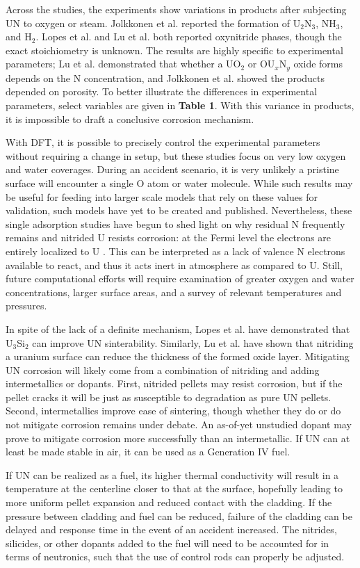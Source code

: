 \documentclass[11pt]{article}
\begin{document}
Across the studies, the experiments show variations in products after subjecting UN to oxygen or steam. Jolkkonen et al. reported the formation of U$_{2}$N$_{3}$, NH$_{3}$, and H$_{2}$. Lopes et al. and Lu et al. both reported oxynitride phases, though the exact stoichiometry is unknown. The results are highly specific to experimental parameters; Lu et al. demonstrated that whether a UO$_{2}$ or  OU$_{x}$N$_{y}$ oxide forms depends on the N concentration, and Jolkkonen et al. showed the products depended on porosity. To better illustrate the differences in experimental parameters, select variables are given in \textbf{Table 1}. With this variance in products, it is impossible to draft a conclusive corrosion mechanism.
\par With DFT, it is possible to precisely control the experimental parameters without requiring a change in setup, but these studies focus on very low oxygen and water coverages. During an accident scenario, it is very unlikely a pristine surface will encounter a single O atom or water molecule. While such results may be useful for feeding into larger scale models that rely on these values for validation,  such models have yet to be created and published. Nevertheless, these single adsorption studies have begun to shed light on why residual N frequently remains and nitrided U resists corrosion: at the Fermi level the electrons are entirely localized to U \cite{Bo2016}. This can be interpreted as a lack of valence N electrons available to react, and thus it acts inert in atmosphere as compared to U. Still, future computational efforts will require examination of greater oxygen and water concentrations, larger surface areas, and a survey of relevant temperatures and pressures. 
\par 
In spite of the lack of a definite mechanism, Lopes et al. \cite{Lopes2017} have demonstrated that U$_{3}$Si$_{2}$ can improve UN sinterability. Similarly, Lu et al. \cite{Lu2016} have shown that nitriding a uranium surface can reduce the thickness of the formed oxide layer.
Mitigating UN corrosion will likely come from a combination of nitriding and adding intermetallics or dopants. First, nitrided pellets may resist corrosion, but if the pellet cracks it will be just as susceptible to degradation as pure UN pellets. Second, intermetallics improve ease of sintering, though whether they do or do not mitigate corrosion remains under debate. An as-of-yet unstudied dopant may prove to mitigate corrosion more successfully than an intermetallic. If UN can at least be made stable in air, it can be used as a Generation IV fuel.
\par 
If UN can be realized as a fuel, its higher thermal conductivity will result in a temperature at the centerline closer to that at the surface, hopefully leading to more uniform pellet expansion and reduced contact with the cladding. If the pressure between cladding and fuel can be reduced, failure of the cladding can be delayed and response time in the event of an accident increased. The nitrides, silicides, or other dopants added to the fuel will need to be accounted for in terms of neutronics, such that the use of control rods can properly be adjusted.
\end{document}
